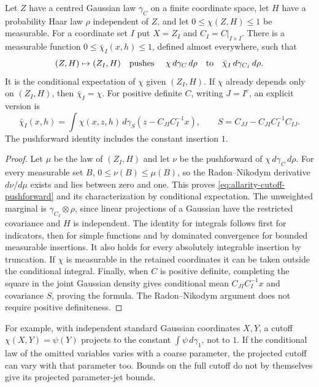 \begin{lemma}
\label{lem:allarity-cutoff-marginal}
Let $Z$ have a centred Gaussian law $\gamma_C$ on a finite coordinate
space, let $H$ have a probability Haar law $\rho$ independent of $Z$,
and let $0\le\chi(Z,H)\le1$ be measurable. For a coordinate set $I$ put
$X=Z_I$ and $C_I=C|_{I\times I}$. There is a measurable function
$0\le\bar\chi_I(x,h)\le1$, defined almost everywhere, such that
\begin{equation}\label{eq:allarity-cutoff-pushforward}
 (Z,H)\mapsto(Z_I,H)\quad\hbox{pushes }\quad
 \chi\,d\gamma_C\,d\rho
 \quad\hbox{to}\quad
 \bar\chi_I\,d\gamma_{C_I}\,d\rho.
\end{equation}
It is the conditional expectation of $\chi$ given $(Z_I,H)$. If
$\chi$ already depends only on $(Z_I,H)$, then $\bar\chi_I=\chi$.
For positive definite $C$, writing $J=I^c$, an explicit version is
\[
 \bar\chi_I(x,h)=\int\chi(x,z,h)\,
 d\gamma_{S}(z-C_{JI}C_I^{-1}x),\qquad
 S=C_{JJ}-C_{JI}C_I^{-1}C_{IJ}.
\]
The pushforward identity includes the constant insertion $1$.
\end{lemma}
\begin{proof}
Let $\mu$ be the law of $(Z_I,H)$ and let $\nu$ be the pushforward of
$\chi\,d\gamma_C\,d\rho$. For every measurable set $B$,
$0\le\nu(B)\le\mu(B)$, so the Radon--Nikodym derivative
$d\nu/d\mu$ exists and lies between zero and one. This proves
\eqref{eq:allarity-cutoff-pushforward} and its characterization by
conditional expectation. The unweighted marginal is
$\gamma_{C_I}\otimes\rho$, since linear projections of a Gaussian
have the restricted covariance and $H$ is independent. The identity
for integrals follows first for indicators, then for simple functions
and by dominated convergence for bounded measurable insertions. It
also holds for every absolutely integrable insertion by truncation.
If $\chi$ is measurable in the retained coordinates it can be taken
outside the conditional integral. Finally, when $C$ is positive
definite, completing the square in the joint Gaussian density gives
conditional mean $C_{JI}C_I^{-1}x$ and covariance $S$, proving the
formula. The Radon--Nikodym argument does not require positive
definiteness.
\end{proof}

For example, with independent standard Gaussian coordinates $X,Y$,
a cutoff $\chi(X,Y)=\psi(Y)$ projects to the constant
$\int\psi\,d\gamma_1$, not to $1$. If the conditional law of the
omitted variables varies with a coarse parameter, the projected cutoff
can vary with that parameter too. Bounds on the full cutoff do not by
themselves give its projected parameter-jet bounds.

